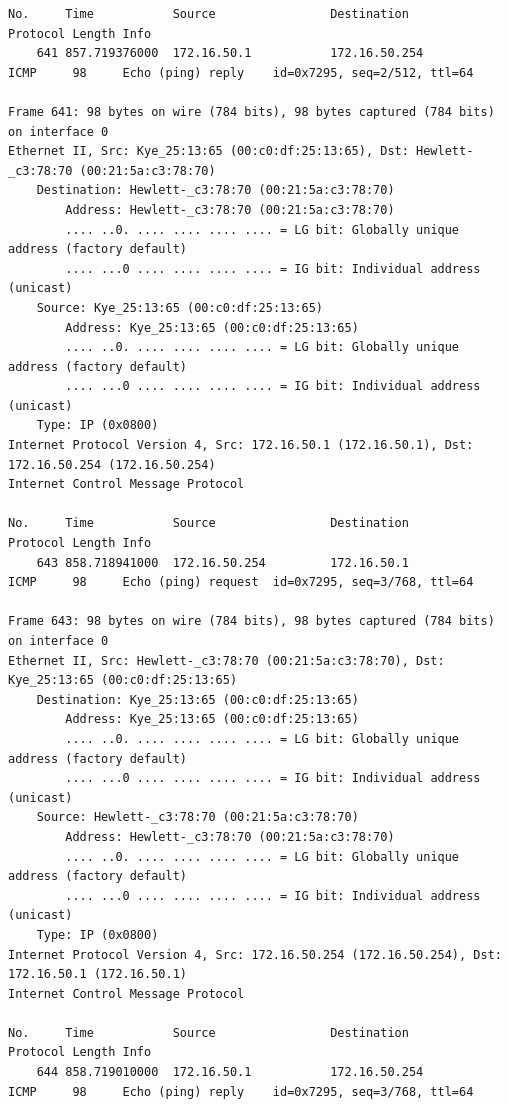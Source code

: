 \documentclass[a4paper,11pt]{article}
\begin{document}
\begin{lstlisting}
No.     Time           Source                Destination           Protocol Length Info
    641 857.719376000  172.16.50.1           172.16.50.254         ICMP     98     Echo (ping) reply    id=0x7295, seq=2/512, ttl=64

Frame 641: 98 bytes on wire (784 bits), 98 bytes captured (784 bits) on interface 0
Ethernet II, Src: Kye_25:13:65 (00:c0:df:25:13:65), Dst: Hewlett-_c3:78:70 (00:21:5a:c3:78:70)
    Destination: Hewlett-_c3:78:70 (00:21:5a:c3:78:70)
        Address: Hewlett-_c3:78:70 (00:21:5a:c3:78:70)
        .... ..0. .... .... .... .... = LG bit: Globally unique address (factory default)
        .... ...0 .... .... .... .... = IG bit: Individual address (unicast)
    Source: Kye_25:13:65 (00:c0:df:25:13:65)
        Address: Kye_25:13:65 (00:c0:df:25:13:65)
        .... ..0. .... .... .... .... = LG bit: Globally unique address (factory default)
        .... ...0 .... .... .... .... = IG bit: Individual address (unicast)
    Type: IP (0x0800)
Internet Protocol Version 4, Src: 172.16.50.1 (172.16.50.1), Dst: 172.16.50.254 (172.16.50.254)
Internet Control Message Protocol

No.     Time           Source                Destination           Protocol Length Info
    643 858.718941000  172.16.50.254         172.16.50.1           ICMP     98     Echo (ping) request  id=0x7295, seq=3/768, ttl=64

Frame 643: 98 bytes on wire (784 bits), 98 bytes captured (784 bits) on interface 0
Ethernet II, Src: Hewlett-_c3:78:70 (00:21:5a:c3:78:70), Dst: Kye_25:13:65 (00:c0:df:25:13:65)
    Destination: Kye_25:13:65 (00:c0:df:25:13:65)
        Address: Kye_25:13:65 (00:c0:df:25:13:65)
        .... ..0. .... .... .... .... = LG bit: Globally unique address (factory default)
        .... ...0 .... .... .... .... = IG bit: Individual address (unicast)
    Source: Hewlett-_c3:78:70 (00:21:5a:c3:78:70)
        Address: Hewlett-_c3:78:70 (00:21:5a:c3:78:70)
        .... ..0. .... .... .... .... = LG bit: Globally unique address (factory default)
        .... ...0 .... .... .... .... = IG bit: Individual address (unicast)
    Type: IP (0x0800)
Internet Protocol Version 4, Src: 172.16.50.254 (172.16.50.254), Dst: 172.16.50.1 (172.16.50.1)
Internet Control Message Protocol

No.     Time           Source                Destination           Protocol Length Info
    644 858.719010000  172.16.50.1           172.16.50.254         ICMP     98     Echo (ping) reply    id=0x7295, seq=3/768, ttl=64


\end{lstlisting}
\end{document}
